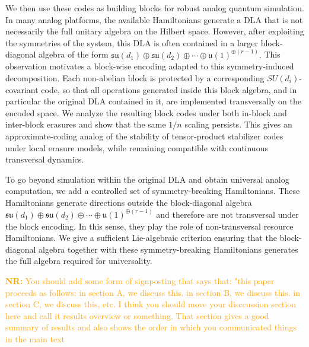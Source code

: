 \documentclass[10pt,twocolumn,superscriptaddress,aps,amsmath,amssymb,citeautoscript,floatfix,prx,longbibliography]{revtex4-2}
\newcounter{alg}
\theoremstyle{plain}
\theoremstyle{plain}
\theoremstyle{plain}
\theoremstyle{plain}
\theoremstyle{plain}
\theoremstyle{plain}
\begin{document}
We then use these codes as building blocks for robust analog quantum simulation. In many analog platforms, the available Hamiltonians generate a DLA that is not necessarily the full unitary algebra on the Hilbert space. However, after exploiting the symmetries of the system, this DLA is often contained in a larger block-diagonal algebra of the form
$
    \mathfrak{su}(d_1)\oplus\mathfrak{su}(d_2)\oplus\cdots
    \oplus \mathfrak{u}(1)^{\oplus(r-1)}.
$
This observation motivates a block-wise encoding adapted to this symmetry-induced decomposition. Each non-abelian block is protected by a corresponding \(SU(d_i)\)-covariant code, so that all operations generated inside this block algebra, and in particular the original DLA contained in it, are implemented transversally on the encoded space. We analyze the resulting block
codes under both in-block and inter-block erasures and show that the same \(1/n\) scaling persists. This gives an approximate-coding analog of the stability of tensor-product stabilizer codes under local erasure models, while remaining compatible with continuous transversal dynamics.

To go beyond simulation within the original DLA and obtain universal analog computation, we add a controlled set of symmetry-breaking Hamiltonians. These Hamiltonians generate directions outside the block-diagonal algebra
$
    \mathfrak{su}(d_1)\oplus\mathfrak{su}(d_2)\oplus\cdots
    \oplus \mathfrak{u}(1)^{\oplus(r-1)}
$
and therefore are not transversal under the block encoding. In this sense, they play the role of non-transversal resource Hamiltonians. We give a sufficient Lie-algebraic criterion ensuring that the block-diagonal algebra together with these symmetry-breaking Hamiltonians generates the full algebra required for universality.

\textcolor{orange}{\textbf{NR:} You should add some form of signposting that says that: "this paper proceeds as follows: in section A, we discuss this. in section B, we discuss this. in section C, we discuss this, etc. I think you should move your disccussion section here and call it results overview or something. That section gives a good summary of results and also shows the order in which you communicated things in the main text}
\end{document}
